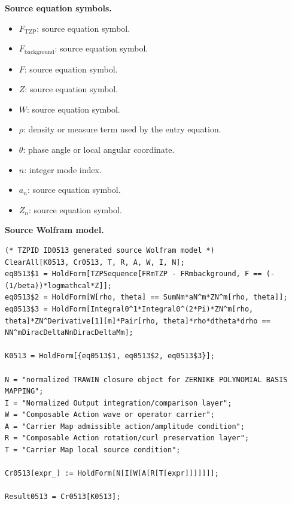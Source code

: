 \begin{minipage}[t]{0.49\linewidth}
\begingroup
\small
\raggedright
\textbf{Source equation symbols.}\par
\begin{itemize}[leftmargin=1.35em,itemsep=1pt,topsep=1pt,parsep=0pt]
    \item $F_{\mathrm{TZP}}$: source equation symbol.
    \item $F_{\mathrm{background}}$: source equation symbol.
    \item $F$: source equation symbol.
    \item $Z$: source equation symbol.
    \item $W$: source equation symbol.
    \item $\rho$: density or measure term used by the entry equation.
    \item $\theta$: phase angle or local angular coordinate.
    \item $n$: integer mode index.
    \item $a_n$: source equation symbol.
    \item $Z_n$: source equation symbol.
\end{itemize}
\endgroup
\end{minipage}\hfill
\begin{minipage}[t]{0.47\linewidth}
\begingroup
\scriptsize
\raggedright
\textbf{Source Wolfram model.}\par
\begin{Verbatim}[fontsize=\tiny,breaklines=true,breakanywhere=true]
(* TZPID ID0513 generated source Wolfram model *)
ClearAll[K0513, Cr0513, T, R, A, W, I, N];
eq0513$1 = HoldForm[TZPSequence[FRmTZP - FRmbackground, F == (-(1/beta))*logmathcal*Z]];
eq0513$2 = HoldForm[W[rho, theta] == SumNm*aN^m*ZN^m[rho, theta]];
eq0513$3 = HoldForm[Integral0^1*Integral0^(2*Pi)*ZN^m[rho, theta]*ZN^Derivative[1][m]*Pair[rho, theta]*rho*dtheta*drho == NN^mDiracDeltaNnDiracDeltaMm];

K0513 = HoldForm[{eq0513$1, eq0513$2, eq0513$3}];

N = "normalized TRAWIN closure object for ZERNIKE POLYNOMIAL BASIS MAPPING";
I = "Normalized Output integration/comparison layer";
W = "Composable Action wave or operator carrier";
A = "Carrier Map admissible action/amplitude condition";
R = "Composable Action rotation/curl preservation layer";
T = "Carrier Map local source condition";

Cr0513[expr_] := HoldForm[N[I[W[A[R[T[expr]]]]]]];

Result0513 = Cr0513[K0513];
\end{Verbatim}
\endgroup
\end{minipage}

